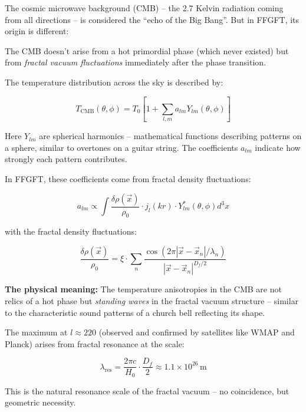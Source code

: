 \documentclass[12pt,a4paper]{article}
\begin{document}
The cosmic microwave background (CMB) -- the 2.7 Kelvin radiation coming from all directions -- is considered the ``echo of the Big Bang''. But in FFGFT, its origin is different:

The CMB doesn't arise from a hot primordial phase (which never existed) but from \textit{fractal vacuum fluctuations} immediately after the phase transition.

The temperature distribution across the sky is described by:

\begin{equation}
T_{\text{CMB}}(\theta, \phi) = T_0 \left[1 + \sum_{l,m} a_{lm} Y_{lm}(\theta, \phi)\right]
\end{equation}

Here $Y_{lm}$ are spherical harmonics -- mathematical functions describing patterns on a sphere, similar to overtones on a guitar string. The coefficients $a_{lm}$ indicate how strongly each pattern contributes.

In FFGFT, these coefficients come from fractal density fluctuations:

\begin{equation}
a_{lm} \propto \int \frac{\delta \rho(\vec{x})}{\rho_0} \cdot j_l(kr) \cdot Y_{lm}^*(\theta, \phi) d^3x
\end{equation}

with the fractal density fluctuations:

\begin{equation}
\frac{\delta \rho(\vec{x})}{\rho_0} = \xi \cdot \sum_n \frac{\cos(2\pi |\vec{x} - \vec{x}_n|/\lambda_n)}{|\vec{x} - \vec{x}_n|^{D_f/2}}
\end{equation}

\textbf{The physical meaning:} The temperature anisotropies in the CMB are not relics of a hot phase but \textit{standing waves} in the fractal vacuum structure -- similar to the characteristic sound patterns of a church bell reflecting its shape.

The maximum at $l \approx 220$ (observed and confirmed by satellites like WMAP and Planck) arises from fractal resonance at the scale:

\begin{equation}
\lambda_{\text{res}} = \frac{2\pi c}{H_0} \cdot \frac{D_f}{2} \approx 1.1 \times 10^{26} \, \text{m}
\end{equation}

This is the natural resonance scale of the fractal vacuum -- no coincidence, but geometric necessity.
\end{document}
